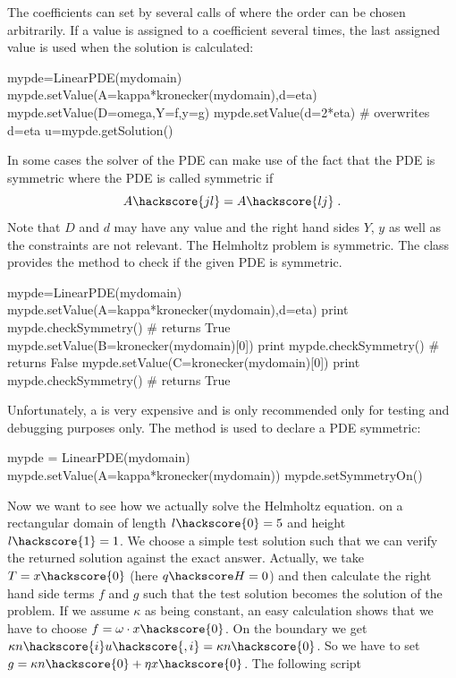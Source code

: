 The coefficients can set by several calls of  where the order can be chosen arbitrarily. 
If a value is assigned to a coefficient several times, the last assigned value is used when
the solution is calculated:
\begin{python}
mypde=LinearPDE(mydomain)
mypde.setValue(A=kappa*kronecker(mydomain),d=eta)
mypde.setValue(D=omega,Y=f,y=g)
mypde.setValue(d=2*eta) # overwrites d=eta
u=mypde.getSolution()
\end{python}
In some cases the solver of the PDE can make use of the fact that the PDE is symmetric where the 
PDE is called symmetric if 
\begin{equation}\label{LINEARPDE.SINGLE.4  TUTORIAL}
A\hackscore{jl}=A\hackscore{lj}\;.
\end{equation}
Note that $D$ and $d$ may have any value and the right hand sides $Y$, $y$ as well as the constraints
are not relevant. The Helmholtz problem is symmetric. 
The \LinearPDE class provides the method  to check if the given PDE is symmetric. 
\begin{python}
mypde=LinearPDE(mydomain)
mypde.setValue(A=kappa*kronecker(mydomain),d=eta)
print mypde.checkSymmetry() # returns True
mypde.setValue(B=kronecker(mydomain)[0])
print mypde.checkSymmetry() # returns False
mypde.setValue(C=kronecker(mydomain)[0])
print mypde.checkSymmetry() # returns True
\end{python}
Unfortunately, a  is very expensive and is only recommended only for
testing and debugging purposes only. The  method is used to
declare a PDE symmetric:
\begin{python}
mypde = LinearPDE(mydomain)
mypde.setValue(A=kappa*kronecker(mydomain))
mypde.setSymmetryOn()
\end{python}
Now we want to see how we actually solve the Helmholtz equation.
on a rectangular domain
of length $l\hackscore{0}=5$ and height $l\hackscore{1}=1$. We choose a simple test solution such that we 
can verify the returned solution against the exact answer. Actually, we 
take $T=x\hackscore{0}$ (here $q\hackscore H = 0$) and then calculate the right hand side terms $f$ and $g$ such that
the test solution becomes the solution of the problem. If we assume $\kappa$ as being constant, 
an easy calculation shows that we have to choose $f=\omega \cdot x\hackscore{0}$. On the boundary we get
$\kappa n\hackscore{i} u\hackscore{,i}=\kappa n\hackscore{0}$.  
So we have to set $g=\kappa n\hackscore{0}+\eta x\hackscore{0}$. The following script  
